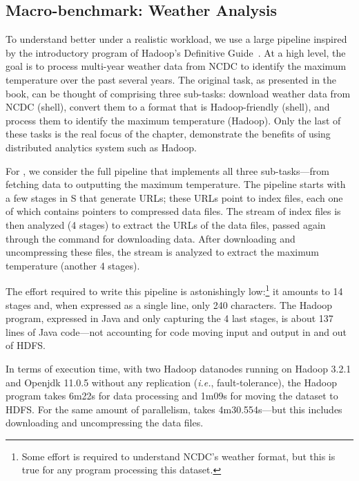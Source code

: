 \documentclass[sigplan,10pt,review,anonymous]{acmart}
\newcommand{\ie}{{\em i.e.}, }
\newcommand{\cn}[1]{\mbox{\textcircled{\footnotesize #1}}}
\newcommand{\sta}{\cn{\textsc{S}}\xspace}
\begin{document}
\subsection{Macro-benchmark: Weather Analysis}
\label{macro1}

To understand \sys better under a realistic workload, we use a large pipeline inspired by the introductory program of Hadoop's Definitive Guide~\cite[Chapter 2]{hadoop:15}.
At a high level, the goal is to process multi-year weather data from NCDC to identify the maximum temperature over the past several years.
The original task, as presented in the book, can be thought of comprising three sub-tasks:
  download weather data from NCDC (shell), convert them to a format that is Hadoop-friendly (shell), and process them to identify the maximum temperature (Hadoop).
Only the last of these tasks is the real focus of the chapter, demonstrate the benefits of using distributed analytics system such as Hadoop.

For \sys, we consider the full pipeline that implements all three sub-tasks---from fetching data to outputting the maximum temperature.
The pipeline starts with a few stages in \sta  that generate URLs;
  these URLs point to index files, each one of which contains pointers to compressed data files.
The stream of index files is then analyzed (4 stages) to extract the URLs of the data files, passed again through the command for downloading data.
After downloading and uncompressing these files, the stream is analyzed to extract the maximum temperature (another 4 stages).

The effort required to write this pipeline is astonishingly low:\footnote{
  Some effort is required to understand NCDC's weather format, but this is true for any program processing this dataset.
}
  it amounts to 14 stages and, when expressed as a single line, only 240 characters.
The Hadoop program, expressed in Java and only capturing the 4 last stages, is about 137 lines of Java code---not accounting for code moving input and output in and out of HDFS.

In terms of execution time, with two Hadoop datanodes running on Hadoop 3.2.1 and Openjdk 11.0.5 without any replication (\ie fault-tolerance), the Hadoop program takes 6m22s for data processing and 1m09s for moving the dataset to HDFS.
For the same amount of parallelism, \sys takes 4m30.554s---but this includes downloading and uncompressing the data files.

\end{document}
